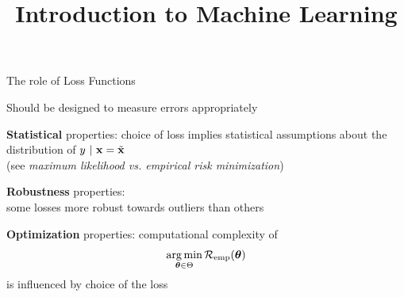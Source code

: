 \documentclass[11pt,compress,t,notes=noshow, xcolor=table]{beamer}
\title{Introduction to Machine Learning}
\begin{document}
    

\begin{vbframe}{The role of Loss Functions}

\vfill

\begin{itemizeL}

\item Should be designed to measure errors appropriately

\item \textbf{Statistical} properties: choice of loss implies statistical assumptions about the distribution of $y ~|~ \mathbf{x} = \tilde{\mathbf{x}}$ \\
(see \emph{maximum likelihood vs. empirical risk minimization})
\item \textbf{Robustness} properties: \\
some losses more robust towards outliers than others
\item \textbf{Optimization} properties: computational complexity of
$$
\mathop{\mathrm{arg\,min}}_{\bm{\theta} \in \Theta} \mathcal{R}_{\text{emp}}(\bm{\theta})
$$
is influenced by choice of the loss 
\end{itemizeL}


\end{vbframe}

\end{document}
